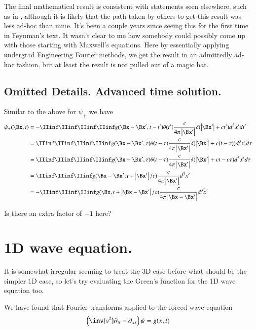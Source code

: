 The final mathematical result is consistent with statements seen elsewhere, such as in \cite{feynman1963flp}, although it is
likely that the path taken by others to get this result was less ad-hoc than mine.
It's been a couple years since seeing this for the
first time in Feynman's text.
It wasn't clear to me how somebody could possibly come up with those starting with Maxwell's equations.
Here by essentially applying undergrad Engineering Fourier methods, we get the result in an admittedly ad-hoc fashion, but at least the result is not
pulled out of a magic hat.

\subsection{Omitted Details.  Advanced time solution. }

Similar to the above for $\psi_{+}$ we have
\begin{align*}
{\psi}_{+}(\Bx, t)
&= -\IIinf \IIinf \IIinf \IIinf g(\Bx - \Bx', t - t') \theta(t') \frac{c }{4\pi \Abs{\Bx'}} \delta(\Abs{\Bx'} + c t') d^3 x' dt' \\
&= \IIinf \IIinf \IIinf \IIinf g(\Bx - \Bx', \tau) \theta(t -\tau) \frac{c }{4\pi \Abs{\Bx'}} \delta(\Abs{\Bx'} + c (t -\tau)) d^3 x' d\tau \\
&= \IIinf \IIinf \IIinf \IIinf g(\Bx - \Bx', \tau) \theta(t -\tau) \frac{c }{4\pi \Abs{\Bx'}} \delta(\Abs{\Bx'} + c t -c\tau) d^3 x' d\tau \\
&= \IIinf \IIinf \IIinf g(\Bx - \Bx', t + \Abs{\Bx'}/c) \frac{c }{4\pi \Abs{\Bx'}} d^3 x' \\
&= -\IIinf \IIinf \IIinf g(\Bx, t + \Abs{\Bx -\Bx'}/c) \frac{c }{4\pi \Abs{\Bx -\Bx'}} d^3 x' \\
\end{align*}

Is there an extra factor of $-1$ here?

\section{1D wave equation. }

It is somewhat irregular seeming to treat the 3D case before what should be the simpler 1D case, so let's
try evaluating the Green's function for the 1D wave equation too.

We have found that Fourier transforms applied to the forced wave equation
\begin{align}
\left( \inv{v^2} \partial_{tt} -\partial_{xx} \right)\psi = g(x,t)
\end{align}

